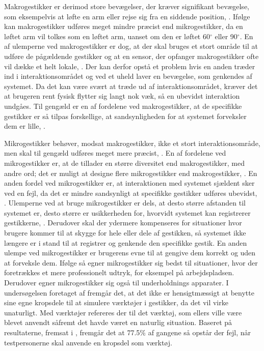 Makrogestikker er derimod store bevægelser, der kræver signifikant bevægelse, som eksempelvis at løfte en arm eller rejse sig fra en siddende position, \parencite[s. 6]{PDF:UsabilityofMicroVsMacroGestures}. Ifølge \textcite[s. 9]{PDF:UsabilityofMicroVsMacroGestures} kan makrogestikker udføres meget mindre præcist end mikrogestikker, da en løftet arm vil tolkes som en løftet arm, uanset om den er løftet 60$^{\circ}$ eller 90$^{\circ}$. En af ulemperne ved makrogestikker er dog, at der skal bruges et stort område til at udføre de pågældende gestikker og at en sensor, der opfanger makrogestikker ofte vil dække et helt lokale, \parencite[s. 9]{PDF:UsabilityofMicroVsMacroGestures}. Der kan derfor opstå et problem hvis en anden træder ind i interaktionsområdet og ved et uheld laver en bevægelse, som genkendes af systemet. Da det kan være svært at træde ud af interaktionsområdet, kræver det at brugeren rent fysisk flytter sig langt nok væk, så en ubevidst interaktion undgåes. Til gengæld er en af fordelene ved makrogestikker, at de specifikke gestikker er så tilpas forskellige, at sandsynligheden for at systemet forveksler dem er lille, \parencite[s. 9]{PDF:UsabilityofMicroVsMacroGestures}.  

Mikrogestikker behøver, modsat makrogestikker, ikke et stort interaktionsområde, men skal til gengæld udføres meget mere præcist, \parencite[s. 10]{PDF:UsabilityofMicroVsMacroGestures}. En af fordelene ved mikrogestikker er, at de tillader en større diversitet end makrogestikker, med andre ord; det er muligt at designe flere mikrogestikker end makrogestikker, \parencite[s. 10]{PDF:UsabilityofMicroVsMacroGestures}. En anden fordel ved mikrogestikker er, at interaktionen med systemet sjældent sker ved en fejl, da det er mindre sandsynligt at specifikke gestikker udføres ubevidst, \parencite[s. 10]{PDF:UsabilityofMicroVsMacroGestures}. Ulemperne ved at bruge mikrogestikker er dels, at desto større afstanden til systemet er, desto større er usikkerheden for, hvorvidt systemet kan registrerer gestikkerne, \parencite[s. 10]{PDF:UsabilityofMicroVsMacroGestures}. Derudover skal der ydermere kompenseres for situationer hvor brugere kommer til at skygge for hele eller dele af gestikken, så systemet ikke længere er i stand til at registrer og genkende den specifikke gestik. En anden ulempe ved mikrogestikker er brugerens evne til at gengive dem korrekt og uden at forveksle dem. Ifølge \textcite[s. 10]{PDF:UsabilityofMicroVsMacroGestures} så egner mikrogestikker sig bedst til situationer, hvor der foretrækkes et mere professionelt udtryk, for eksempel på arbejdspladsen. Derudover egner mikrogestikker sig også til underholdnings apparater.\blankline
%
I undersøgelsen foretaget af \textcite[s. 823]{PDF:UnderstandingNaturalness} fremgår det, at det ikke er hensigtmæssigt at benytte sine egne kropsdele til at simulere værktøjer i gestikker, da det vil virke unaturligt. Med værktøjer refereres der til det værktøj, som ellers ville være blevet anvendt såfremt det havde været en naturlig situation. Baseret på resultaterne, fremsat i \textcite[s. 823]{PDF:UnderstandingNaturalness}, fremgår det at 77.5\% af gangene så opstår der fejl, når testpersonerne skal anvende en kropsdel som værktøj.

